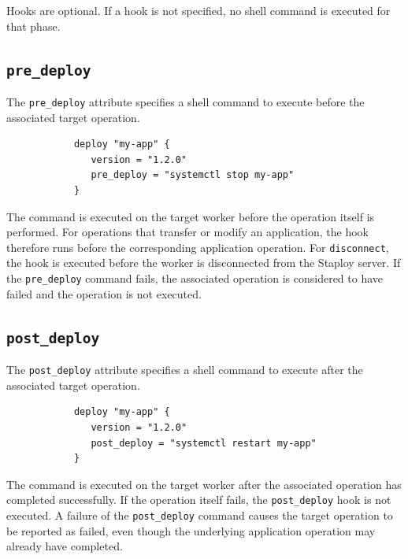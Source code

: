 \documentclass[11pt,a4paper]{article}
\begin{document}
    Hooks are optional.
    If a hook is not specified, no shell command is executed for that phase.

    \subsection{\texttt{pre\_deploy}}\label{subsec:texttt:pre_deploy}

    The \texttt{pre\_deploy} attribute specifies a shell command to execute before the associated target operation.

    \begin{center}
        \begin{verbatim}
            deploy "my-app" {
               version = "1.2.0"
               pre_deploy = "systemctl stop my-app"
            }
        \end{verbatim}
    \end{center}

    The command is executed on the target worker before the operation itself is performed.
    For operations that transfer or modify an application, the hook therefore runs before the corresponding application operation.
    For \texttt{disconnect}, the hook is executed before the worker is disconnected from the Staploy server.
    If the \texttt{pre\_deploy} command fails, the associated operation is considered to have failed and the operation is not executed.

    \subsection{\texttt{post\_deploy}}\label{subsec:texttt:post_deploy}

    The \texttt{post\_deploy} attribute specifies a shell command to execute after the associated target operation.

    \begin{center}
        \begin{verbatim}
            deploy "my-app" {
               version = "1.2.0"
               post_deploy = "systemctl restart my-app"
            }
        \end{verbatim}
    \end{center}

    The command is executed on the target worker after the associated operation has completed successfully.
    If the operation itself fails, the \texttt{post\_deploy} hook is not executed.
    A failure of the \texttt{post\_deploy} command causes the target operation to be reported as failed, even though the underlying application operation may already have completed.
\end{document}
